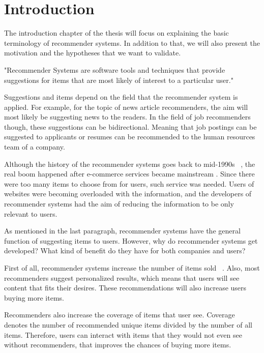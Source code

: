 \renewcommand\textbullet{\ensuremath{\bullet}}

\chapter{Introduction}\label{chapter:introduction}

The introduction chapter of the thesis will focus on explaining the basic terminology of recommender systems. In addition to that, we will also present the motivation and the hypotheses that we want to validate.


"Recommender Systems are software tools and techniques that provide suggestions for items that are most likely of interest to a particular user." ~\parencite{Ricci2015}

Suggestions and items depend on the field that the recommender system is applied. For example, for the topic of news article recommenders, the aim will most likely be suggesting news to the readers. In the field of job recommenders though, these suggestions can be bidirectional. Meaning that job postings can be suggested to applicants or resumes can be recommended to the human resources team of a company.

Although the history of the recommender systems goes back to mid-1990s ~\parencite{PARK201210059}, the real boom happened after e-commerce services became mainstream \cite{smith2017two}. Since there were too many items to choose from for users, such service was needed. Users of websites were becoming overloaded with the information, and the developers of recommender systems had the aim of reducing the information to be only relevant to users. 


As mentioned in the last paragraph, recommender systems have the general function of suggesting items to users. However, why do recommender systems get developed? What kind of benefit do they have for both companies and users?

First of all, recommender systems increase the number of items sold  ~\parencite{Ricci2015}.  Also, most recommenders suggest personalized results, which means that users will see content that fits their desires. These recommendations will also increase users buying more items.

Recommenders also increase the coverage of items that user see. Coverage denotes the number of recommended unique items divided by the number of all items. Therefore, users can interact with items that they would not even see without recommenders, that improves the chances of buying more items.

